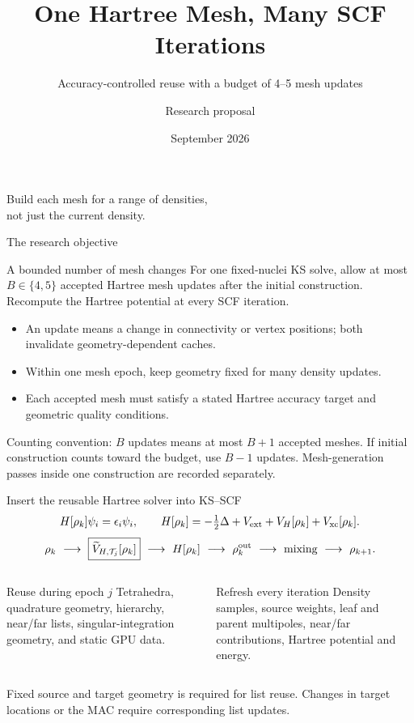 \documentclass[aspectratio=169,10pt]{beamer}
\title{One Hartree Mesh, Many SCF Iterations}
\subtitle{Accuracy-controlled reuse with a budget of 4--5 mesh updates}
\author{Research proposal}
\date{September 2026}
\begin{document}
\begin{frame}[plain]
\titlepage
\begin{center}\color{teal}\large Build each mesh for a range of densities,\\not just the current density.\end{center}
\end{frame}

\begin{frame}{The research objective}
\begin{block}{A bounded number of mesh changes}
For one fixed-nuclei KS solve, allow at most $B\in\{4,5\}$ accepted Hartree mesh updates after the initial construction. Recompute the Hartree potential at every SCF iteration.
\end{block}
\begin{itemize}
\item An update means a change in connectivity or vertex positions; both invalidate geometry-dependent caches.
\item Within one mesh epoch, keep geometry fixed for many density updates.
\item Each accepted mesh must satisfy a stated Hartree accuracy target and geometric quality conditions.
\end{itemize}
\small\color{muted}Counting convention: $B$ updates means at most $B+1$ accepted meshes. If initial construction counts toward the budget, use $B-1$ updates. Mesh-generation passes inside one construction are recorded separately.
\end{frame}

\begin{frame}{Insert the reusable Hartree solver into KS--SCF}
\small
\[
 H[\rho_k]\psi_i=\epsilon_i\psi_i,\qquad
 H[\rho_k]=-\tfrac12\Delta+V_{\rm ext}+V_H[\rho_k]+V_{\rm xc}[\rho_k].
\]
\[
\rho_k\ \longrightarrow\ \boxed{\widetilde V_{H,\mathcal T_j}[\rho_k]}
\ \longrightarrow\ H[\rho_k]\ \longrightarrow\ \rho_k^{\rm out}
\ \longrightarrow\ \text{mixing}\ \longrightarrow\ \rho_{k+1}.
\]
\begin{columns}[T,onlytextwidth]
\begin{block}{Reuse during epoch $j$}
Tetrahedra, quadrature geometry, hierarchy, near/far lists, singular-integration geometry, and static GPU data.
\end{block}
\begin{block}{Refresh every iteration}
Density samples, source weights, leaf and parent multipoles, near/far contributions, Hartree potential and energy.
\end{block}
\end{columns}
\small Fixed source and target geometry is required for list reuse. Changes in target locations or the MAC require corresponding list updates.
\end{frame}
\end{document}
